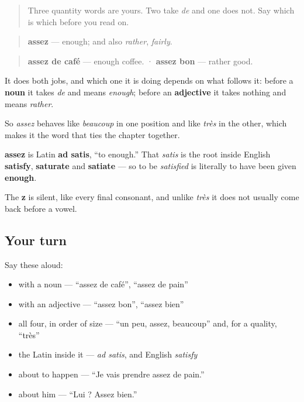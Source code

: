 \label{lesson:FR-C40-assez}



\begin{quote}
Three quantity words are yours. Two take \emph{de} and one does not. Say which is which before you read on.
\end{quote}

\begin{cousinweb}
\begin{quote}
\textbf{assez} — enough; and also \emph{rather}, \emph{fairly}.
\end{quote}

\begin{quote}
\textbf{assez de café} — enough coffee. · \textbf{assez bon} — rather good.
\end{quote}

It does both jobs, and which one it is doing depends on what follows it: before a \textbf{noun} it takes \emph{de} and means \emph{enough}; before an \textbf{adjective} it takes nothing and means \emph{rather}.

So \emph{assez} behaves like \emph{beaucoup} in one position and like \emph{très} in the other, which makes it the word that ties the chapter together.

\textbf{assez} is Latin \textbf{ad satis}, \textquotedblleft{}to enough.\textquotedblright{} That \emph{satis} is the root inside English \textbf{satisfy}, \textbf{saturate} and \textbf{satiate} — so to be \emph{satisfied} is literally to have been given \textbf{enough}.

The \textbf{z} is silent, like every final consonant, and unlike \emph{très} it does not usually come back before a vowel.
\end{cousinweb}

\subsection*{Your turn}
Say these aloud:

\begin{itemize}
\raggedright
  \item with a noun — \textquotedblleft{}assez de café\textquotedblright{}, \textquotedblleft{}assez de pain\textquotedblright{}
  \item with an adjective — \textquotedblleft{}assez bon\textquotedblright{}, \textquotedblleft{}assez bien\textquotedblright{}
  \item all four, in order of size — \textquotedblleft{}un peu, assez, beaucoup\textquotedblright{} and, for a quality, \textquotedblleft{}très\textquotedblright{}
  \item the Latin inside it — \emph{ad satis}, and English \emph{satisfy}
  \item about to happen — \textquotedblleft{}Je vais prendre assez de pain.\textquotedblright{}
  \item about him — \textquotedblleft{}Lui ? Assez bien.\textquotedblright{}
\end{itemize}

